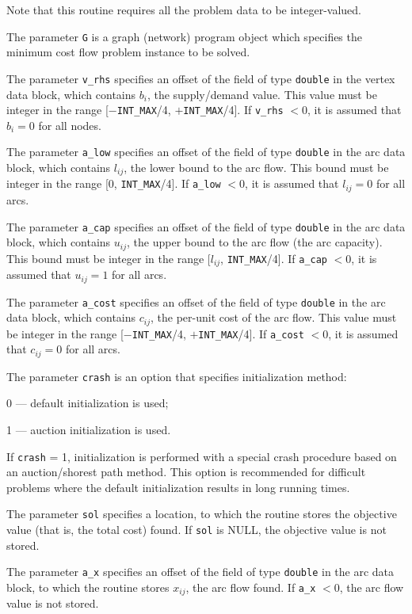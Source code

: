 \documentclass[11pt]{report}
\begin{document}
Note that this routine requires all the problem data to be
integer-valued.

The parameter \verb|G| is a graph (network) program object which
specifies the minimum cost flow problem instance to be solved.

The parameter \verb|v_rhs| specifies an offset of the field of type
\verb|double| in the vertex data block, which contains $b_i$, the
supply/demand value. This value must be integer in the range
[$-$\verb|INT_MAX|/4, $+$\verb|INT_MAX|/4]. If \verb|v_rhs| $<0$, it is
assumed that $b_i=0$ for all nodes.

The parameter \verb|a_low| specifies an offset of the field of type
\verb|double| in the arc data block, which contains $l_{ij}$, the lower
bound to the arc flow. This bound must be integer in the range
{\linebreak} [$0$, \verb|INT_MAX|/4]. If \verb|a_low| $<0$, it is
assumed that $l_{ij}=0$ for all arcs.

The parameter \verb|a_cap| specifies an offset of the field of type
\verb|double| in the arc data block, which contains $u_{ij}$, the upper
bound to the arc flow (the arc capacity). This bound must be integer in
the range [$l_{ij}$, \verb|INT_MAX|/4]. If \verb|a_cap| $<0$, it is
assumed that $u_{ij}=1$ for all arcs.

The parameter \verb|a_cost| specifies an offset of the field of type
\verb|double| in the arc data block, which contains $c_{ij}$, the
per-unit cost of the arc flow. This value must be integer in the range
[$-$\verb|INT_MAX|/4, $+$\verb|INT_MAX|/4]. If \verb|a_cost| $<0$, it
is assumed that $c_{ij}=0$ for all arcs.

\newpage

The parameter \verb|crash| is an option that specifies initialization
method:

0 --- default initialization is used;

1 --- auction initialization is used.

\noindent
If \verb|crash| = 1, initialization is performed with a special crash
procedure based on an auction/shorest path method. This option is
recommended for difficult problems where the default initialization
results in long running times.

The parameter \verb|sol| specifies a location, to which the routine
stores the objective value (that is, the total cost) found. If
\verb|sol| is NULL, the objective value is not stored.

The parameter \verb|a_x| specifies an offset of the field of type
\verb|double| in the arc data block, to which the routine stores
$x_{ij}$, the arc flow found. If \verb|a_x| $<0$, the arc flow value is
not stored.
\end{document}
